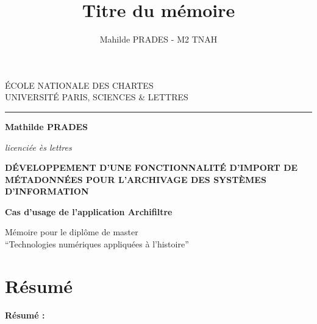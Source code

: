 \documentclass[a4paper,12pt,twoside]{book}
\author{Mahilde PRADES - M2 TNAH}
\title{Titre du mémoire}
\begin{document}
	\begin{titlepage}
		\begin{center}
			
			\bigskip
			
			\begin{large}				
				ÉCOLE NATIONALE DES CHARTES\\
				UNIVERSITÉ PARIS, SCIENCES \& LETTRES
			\end{large}
			\begin{center}\rule{2cm}{0.02cm}\end{center}
			
			\bigskip
			\bigskip
			\bigskip
			\begin{Large}
				\textbf{Mathilde PRADES}\\
			\end{Large}
		
			\begin{normalsize} \textit{licenciée ès lettres}
			\end{normalsize}
			
			\bigskip
			\bigskip
			\bigskip
			
			\begin{Huge}
				\textbf{DÉVELOPPEMENT D'UNE FONCTIONNALITÉ D'IMPORT DE MÉTADONNÉES POUR L'ARCHIVAGE DES SYSTÈMES D'INFORMATION}\\
			\end{Huge}
			\bigskip
			\bigskip
			\begin{LARGE}
				\textbf{Cas d'usage de l'application Archifiltre}\\
			\end{LARGE}
			
			\bigskip
			\bigskip
			\bigskip
			\begin{large}
			\end{large}
			\vfill
			
			\begin{large}
				Mémoire 
				pour le diplôme de master \\
				\enquote{Technologies numériques appliquées à l'histoire} \\
			\end{large}
			
		\end{center}
	\end{titlepage}

	\thispagestyle{empty}	
	\cleardoublepage 
	
\frontmatter

	\chapter{Résumé}
\medskip
	\textbf{Résumé : }
	
\end{document}
